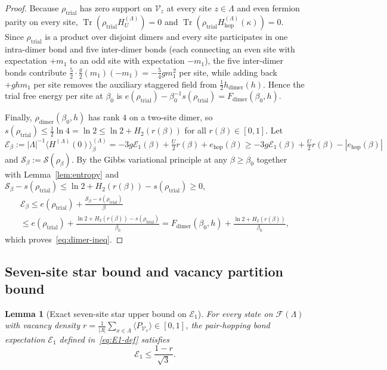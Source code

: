 \documentclass[11pt]{article}
\newtheorem{lemma}[theorem]{Lemma}
\theoremstyle{definition}
\theoremstyle{remark}
\DeclareMathOperator{\Tr}{Tr}
\newcommand{\calF}{\mathcal{F}}
\newcommand{\calV}{\mathcal{V}}
\newcommand{\calE}{\mathcal{E}}
\newcommand{\calS}{\mathcal{S}}
\begin{document}
\begin{proof}
Because $\rho_{\mathrm{trial}}$ has zero support on $\calV_z$ at every site $z \in \Lambda$ and even fermion parity on every site, $\Tr(\rho_{\mathrm{trial}} H_U^{(\Lambda)}) = 0$ and $\Tr(\rho_{\mathrm{trial}} H_{\mathrm{hop}}^{(\Lambda)}(\kappa)) = 0$. Since $\rho_{\mathrm{trial}}$ is a product over disjoint dimers and every site participates in one intra-dimer bond and five inter-dimer bonds (each connecting an even site with expectation $+m_1$ to an odd site with expectation $-m_1$), the five inter-dimer bonds contribute $\frac{5}{2} \cdot \frac{g}{2}(m_1)(-m_1) = -\frac{5}{4}g m_1^2$ per site, while adding back $+gh m_1$ per site removes the auxiliary staggered field from $\frac{1}{2}h_{\mathrm{dimer}}(h)$. Hence the trial free energy per site at $\beta_0$ is $e(\rho_{\mathrm{trial}}) - \beta_0^{-1} s(\rho_{\mathrm{trial}}) = F_{\mathrm{dimer}}(\beta_0, h)$.

Finally, $\rho_{\mathrm{dimer}}(\beta_0, h)$ has rank $4$ on a two-site dimer, so $s(\rho_{\mathrm{trial}}) \le \frac{1}{2}\ln 4 = \ln 2 \le \ln 2 + H_2(r(\beta))$ for all $r(\beta) \in [0, 1]$. Let $\calE_\beta := |\Lambda|^{-1}\langle H^{(\Lambda)}(0)\rangle_\beta^{(\Lambda)} = -3g\calE_1(\beta) + \frac{U}{2}r(\beta) + e_{\mathrm{hop}}(\beta) \ge -3g\calE_1(\beta) + \frac{U}{2}r(\beta) - |e_{\mathrm{hop}}(\beta)|$ and $\calS_\beta := \calS(\rho_\beta)$. By the Gibbs variational principle at any $\beta \ge \beta_0$ together with Lemma~\ref{lem:entropy} and $\calS_\beta - s(\rho_{\mathrm{trial}}) \le \ln 2 + H_2(r(\beta)) - s(\rho_{\mathrm{trial}}) \ge 0$,
\begin{multline}\label{eq:gibbs-all-beta}
\calE_\beta \le e(\rho_{\mathrm{trial}}) + \frac{\calS_\beta - s(\rho_{\mathrm{trial}})}{\beta} \\
\le e(\rho_{\mathrm{trial}}) + \frac{\ln 2 + H_2(r(\beta)) - s(\rho_{\mathrm{trial}})}{\beta_0} = F_{\mathrm{dimer}}(\beta_0, h) + \frac{\ln 2 + H_2(r(\beta))}{\beta_0},
\end{multline}
which proves~\eqref{eq:dimer-ineq}.
\end{proof}

\subsection{Seven-site star bound and vacancy partition bound}\label{subsec:star-vacancy}

\begin{lemma}[Exact seven-site star upper bound on $\calE_1$]\label{lem:star}
For every state on $\calF(\Lambda)$ with vacancy density $r = \frac{1}{|\Lambda|}\sum_{x \in \Lambda} \langle P_{\calV_x} \rangle \in [0, 1]$, the pair-hopping bond expectation $\calE_1$ defined in~\eqref{eq:E1-def} satisfies
\begin{equation}\label{eq:star-bound}
\calE_1 \le \frac{1 - r}{\sqrt{3}}.
\end{equation}
\end{lemma}
\end{document}
